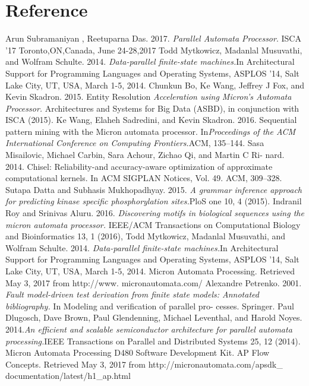 \section{Reference}
\begin{thebibliography}{9}
    Arun Subramaniyan , Reetuparna Das. 2017.
    \textit{Parallel Automata Processor}. 
    ISCA ’17 Toronto,ON,Canada, June 24-28,2017
    Todd Mytkowicz, Madanlal Musuvathi, and Wolfram Schulte. 2014.
\textit{Data-parallel
finite-state machines.}In Architectural Support for Programming Languages and
Operating Systems, ASPLOS ’14, Salt Lake City, UT, USA, March 1-5, 2014.
    Chunkun Bo, Ke Wang, Jeffrey J Fox, and Kevin Skadron. 2015. Entity Resolution
    \textit{Acceleration using Micron’s Automata Processor.}
    Architectures and Systems for
    Big Data (ASBD), in conjunction with ISCA (2015).
    Ke Wang, Elaheh Sadredini, and Kevin Skadron. 2016. Sequential pattern mining
with the Micron automata processor. In\textit{Proceedings of the ACM International
Conference on Computing Frontiers.}ACM, 135–144.
Sasa Misailovic, Michael Carbin, Sara Achour, Zichao Qi, and Martin C Ri-
nard. 2014. Chisel: Reliability-and accuracy-aware optimization of approximate
computational kernels. In ACM SIGPLAN Notices, Vol. 49. ACM, 309–328.
Sutapa Datta and Subhasis Mukhopadhyay. 2015. \textit{A grammar inference approach
for predicting kinase specific phosphorylation sites.}PloS one 10, 4 (2015).
Indranil Roy and Srinivas Aluru. 2016. \textit{Discovering motifs in biological sequences
using the micron automata processor.}
IEEE/ACM Transactions on Computational
Biology and Bioinformatics 13, 1 (2016),
Todd Mytkowicz, Madanlal Musuvathi, and Wolfram Schulte. 2014.
\textit{Data-parallel
finite-state machines.}In Architectural Support for Programming Languages and
Operating Systems, ASPLOS ’14, Salt Lake City, UT, USA, March 1-5, 2014.
Micron Automata Processing. Retrieved May 3, 2017 from http://www.
micronautomata.com/
Alexandre Petrenko. 2001.
\textit{Fault model-driven test derivation from finite state
models: Annotated bibliography.}
In Modeling and verification of parallel pro-
cesses. Springer.
Paul Dlugosch, Dave Brown, Paul Glendenning, Michael Leventhal, and Harold
Noyes. 2014.\textit{An efficient and scalable semiconductor architecture for parallel
automata processing.}IEEE Transactions on Parallel and Distributed Systems 25,
12 (2014).
Micron Automata Processing D480 Software Development Kit. AP Flow
Concepts. Retrieved May 3, 2017 from http://micronautomata.com/apsdk\_
documentation/latest/h1\_ap.html

\end{thebibliography}